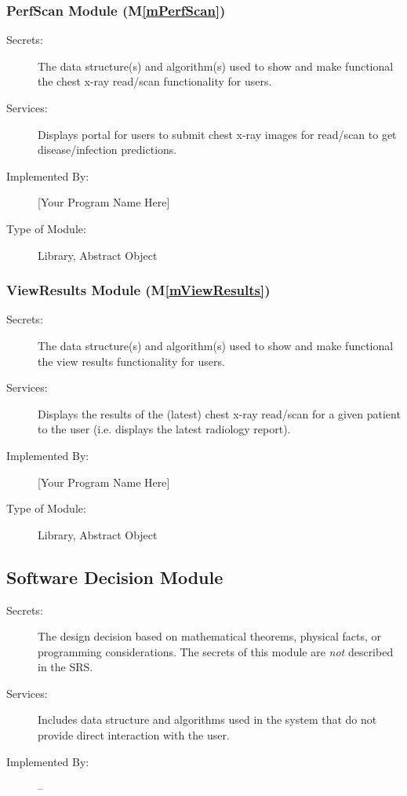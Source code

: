 \documentclass[12pt, titlepage]{article}
\newcommand{\mref}[1]{M\ref{#1}}
\begin{document}
\subsubsection{PerfScan Module (\mref{mPerfScan})}

\begin{description}
\item[Secrets:] The data structure(s) and algorithm(s) used to show and make
  functional the chest x-ray read/scan functionality for users.
\item[Services:] Displays portal for users to submit chest x-ray images for
  read/scan to get disease/infection predictions.
\item[Implemented By:] [Your Program Name Here]
\item[Type of Module:] Library, Abstract Object
\end{description}

\subsubsection{ViewResults Module (\mref{mViewResults})}

\begin{description}
\item[Secrets:] The data structure(s) and algorithm(s) used to show and make
  functional the view results functionality for users.
\item[Services:] Displays the results of the (latest) chest x-ray read/scan
  for a given patient to the user (i.e. displays the latest radiology report).
\item[Implemented By:] [Your Program Name Here]
\item[Type of Module:] Library, Abstract Object
\end{description}

\subsection{Software Decision Module}

\begin{description}
\item[Secrets:] The design decision based on mathematical theorems, physical
  facts, or programming considerations. The secrets of this module are
  \emph{not} described in the SRS.
\item[Services:] Includes data structure and algorithms used in the system that
  do not provide direct interaction with the user. 
\item[Implemented By:] --
\end{description}
\end{document}
